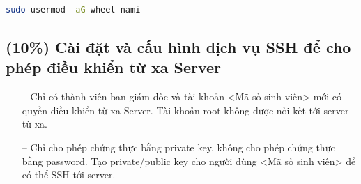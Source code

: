 \documentclass[a4paper, 11pt]{article}
\begin{document}
\begin{lstlisting}[language=bash, caption=Cấp quyền sudo cho user nami]
sudo usermod -aG wheel nami
\end{lstlisting}

\subsection{(10\%)  Cài đặt và cấu hình dịch vụ SSH để cho phép điều khiển từ xa Server}

\begin{itemize}
    \item[--] Chỉ có thành viên ban giám đốc và tài khoản <Mã số sinh viên> mới có quyền điều khiển từ xa Server. Tài khoản root không được nối kết tới server từ xa.
    \item[--] Chỉ cho phép chứng thực bằng private key, không cho phép chứng thực bằng password. Tạo private/public key cho người dùng <Mã số sinh viên> để có thể SSH tới server.
\end{itemize}
\end{document}
